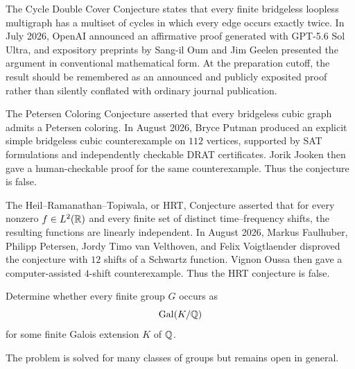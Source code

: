     \begin{fact}
        The Cycle Double Cover Conjecture states that every finite bridgeless
        loopless multigraph has a multiset of cycles in which every edge occurs
        exactly twice. In July 2026, OpenAI announced an affirmative proof
        generated with GPT-5.6 Sol Ultra, and expository preprints by Sang-il
        Oum and Jim Geelen presented the argument in conventional mathematical
        form. At the preparation cutoff, the result should be remembered as an
        announced and publicly exposited proof rather than silently conflated
        with ordinary journal publication.
    \end{fact}

    \begin{fact}
        The Petersen Coloring Conjecture asserted that every bridgeless cubic
        graph admits a Petersen coloring. In August 2026, Bryce Putman produced
        an explicit simple bridgeless cubic counterexample on $112$ vertices,
        supported by SAT formulations and independently checkable DRAT
        certificates. Jorik Jooken then gave a human-checkable proof for the
        same counterexample. Thus the conjecture is false.
    \end{fact}

    \begin{fact}
        The Heil--Ramanathan--Topiwala, or HRT, Conjecture asserted that for
        every nonzero $f\in L^2(\mathbb{R})$ and every finite set of distinct
        time--frequency shifts, the resulting functions are linearly
        independent. In August 2026, Markus Faulhuber, Philipp Petersen, Jordy
        Timo van Velthoven, and Felix Voigtlaender disproved the conjecture with
        $12$ shifts of a Schwartz function. Vignon Oussa then gave a
        computer-assisted $4$-shift counterexample. Thus the HRT conjecture is
        false.
    \end{fact}

    \begin{openproblem}
        Determine whether every finite group $G$ occurs as
        \[
            \operatorname{Gal}(K/\mathbb{Q})
        \]
        for some finite Galois extension $K$ of $\mathbb{Q}$.
    \end{openproblem}

    \begin{remark}
        The problem is solved for many classes of groups but remains open in
        general.
    \end{remark}

